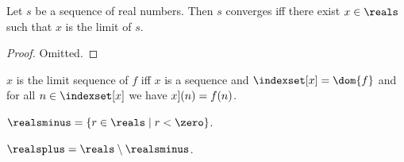 \begin{proposition}\label{existence_of_limit}
    Let $s$ be a sequence of real numbers.
    Then $s$ converges iff there exist $x \in \reals$ 
    such that $x$ is the limit of $s$.
\end{proposition}
\begin{proof}
    Omitted.
\end{proof}

\begin{definition}\label{limit_sequence}
    $x$ is the limit sequence of $f$ iff
    $x$ is a sequence and $\indexset[x] = \dom{f}$ and
    for all $n \in \indexset[x]$ we have
    $\index[x](n) = f(n)$.
\end{definition}

\begin{definition}\label{realsminus}
    $\realsminus = \{r \in \reals \mid r < \zero\}$.
\end{definition}

\begin{abbreviation}\label{realsplus}
    $\realsplus = \reals \setminus \realsminus$.
\end{abbreviation}


